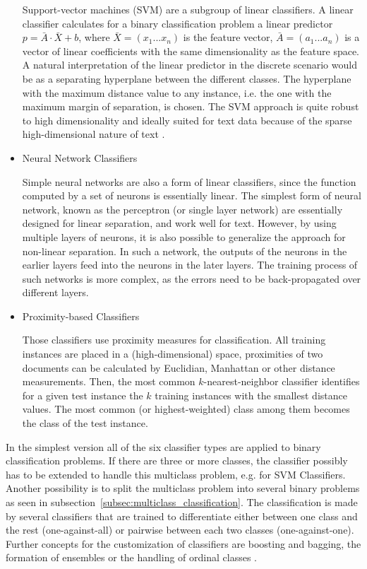 \documentclass[article,type=msc,colorback,accentcolor=tud7b]{tudthesis}
\begin{document}
\begin{itemize}
        Support-vector machines (SVM) are a subgroup of linear classifiers. A linear classifier calculates for a binary classification problem a linear predictor $p=\bar{A}\cdot\bar{X}+b$, where $\bar{X}=(x_{1}...x_{n})$ is the feature vector, $\bar{A}=(a_{1}...a_{n})$ is a vector of linear coefficients with the same dimensionality as the feature space. A natural interpretation of the linear predictor in the discrete scenario would be as a separating hyperplane between the different classes. The hyperplane with the maximum distance value to any instance, i.e. the one with the maximum margin of separation, is chosen. The SVM approach is quite robust to high dimensionality and ideally suited for text data because of the sparse high-dimensional nature of text \autocite{Joachims1997}.
      \item Neural Network Classifiers
      
        Simple neural networks are also a form of linear classifiers, since the function computed by a set of neurons is essentially linear. The simplest form of neural network, known as the perceptron (or single layer network) are essentially designed for linear separation, and work well for text. However, by using multiple layers of neurons, it is also possible to generalize the approach for non-linear separation. In such a network, the outputs of the neurons in the earlier layers feed into the neurons in the later layers. The training process of such networks is more complex, as the errors need to be back-propagated over different layers.
      \item Proximity-based Classifiers
      
        Those classifiers use proximity measures for classification. All training instances are placed in a (high-dimensional) space, proximities of two documents can be calculated by Euclidian, Manhattan or other distance measurements. Then, the most common $k$-nearest-neighbor classifier identifies for a given test instance the $k$ training instances with the smallest distance values. The most common (or highest-weighted) class among them becomes the class of the test instance.
    \end{itemize}
    In the simplest version all of the six classifier types are applied to binary classification problems. If there are three or more classes, the classifier possibly has to be extended to handle this multiclass problem, e.g. for SVM Classifiers. Another possibility is to split the multiclass problem into several binary problems as seen in subsection~\ref{subsec:multiclass_classification}. The classification is made by several classifiers that are trained to differentiate either between one class and the rest (one-against-all) or pairwise between each two classes (one-against-one). Further concepts for the customization of classifiers are boosting and bagging, the formation of ensembles or the handling of ordinal classes \autocite{Aggarwal2012}. \\\\
\end{document}
